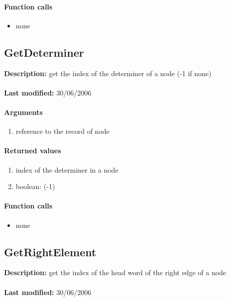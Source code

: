 \paragraph{Function calls}
\begin{itemize}
\item none
\end{itemize}

\subsection{GetDeterminer}
\textbf{Description:} get the index of the determiner of a node (-1 if none)\\
\\\textbf{Last modified:} 30/06/2006

\paragraph{Arguments}
\begin{enumerate}
\item reference to the record of node
\end{enumerate}

\paragraph{Returned values}
\begin{enumerate}
\item index of the determiner in a node
\item boolean: (-1)
\end{enumerate}

\paragraph{Function calls}
\begin{itemize}
\item none
\end{itemize}

\subsection{GetRightElement}
\textbf{Description:} get the index of the head word of the right edge of a node\\
\\\textbf{Last modified:} 30/06/2006

